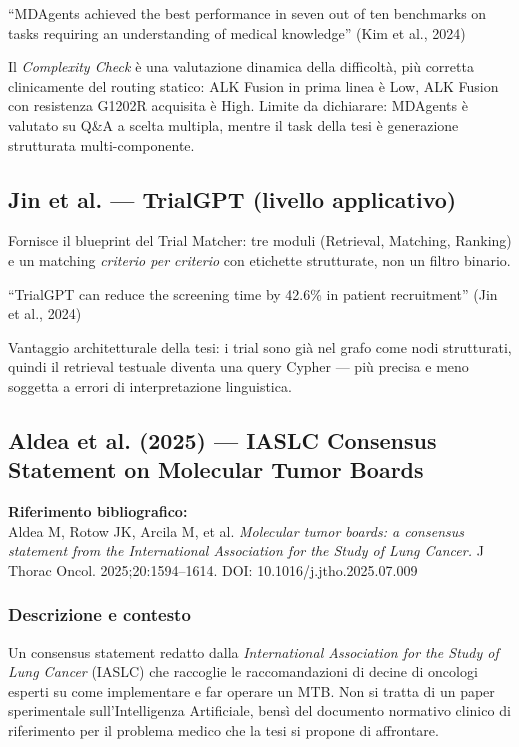\documentclass[11pt,a4paper]{article}
\begin{document}
\begin{quotebox}
``MDAgents achieved the best performance in seven out of ten benchmarks on tasks requiring an understanding of medical knowledge'' \hfill (Kim et al., 2024)
\end{quotebox}

\noindent Il \emph{Complexity Check} \`e una valutazione dinamica della difficolt\`a, pi\`u corretta clinicamente del routing statico: ALK Fusion in prima linea \`e Low, ALK Fusion con resistenza G1202R acquisita \`e High. Limite da dichiarare: MDAgents \`e valutato su Q\&A a scelta multipla, mentre il task della tesi \`e generazione strutturata multi-componente.

\subsection{Jin et al. --- TrialGPT (livello applicativo)}
Fornisce il blueprint del Trial Matcher: tre moduli (Retrieval, Matching, Ranking) e un matching \emph{criterio per criterio} con etichette strutturate, non un filtro binario.

\begin{quotebox}
``TrialGPT can reduce the screening time by 42.6\% in patient recruitment'' \hfill (Jin et al., 2024)
\end{quotebox}

\noindent Vantaggio architetturale della tesi: i trial sono gi\`a nel grafo come nodi strutturati, quindi il retrieval testuale diventa una query Cypher --- pi\`u precisa e meno soggetta a errori di interpretazione linguistica.

\subsection{Aldea et al. (2025) --- IASLC Consensus Statement on Molecular Tumor Boards}

\noindent\textbf{Riferimento bibliografico:}\\
Aldea M, Rotow JK, Arcila M, et al. \textit{Molecular tumor boards: a consensus statement from the International Association for the Study of Lung Cancer.} J Thorac Oncol. 2025;20:1594--1614. DOI: 10.1016/j.jtho.2025.07.009

\subsubsection*{Descrizione e contesto}
Un consensus statement redatto dalla \emph{International Association for the Study of Lung Cancer} (IASLC) che raccoglie le raccomandazioni di decine di oncologi esperti su come implementare e far operare un MTB. Non si tratta di un paper sperimentale sull'Intelligenza Artificiale, bensì del documento normativo clinico di riferimento per il problema medico che la tesi si propone di affrontare.
\end{document}
